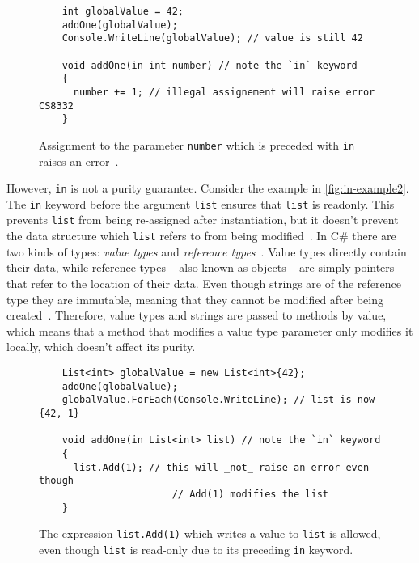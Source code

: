 \documentclass[a4paper,12pt]{article}
\begin{document}
\begin{figure}[H]
  \centering
  \begin{lstlisting}
    int globalValue = 42;
    addOne(globalValue);
    Console.WriteLine(globalValue); // value is still 42

    void addOne(in int number) // note the `in` keyword
    {
      number += 1; // illegal assignement will raise error CS8332
    }
  \end{lstlisting}
  \caption{Assignment to the parameter \texttt{number} which is preceded with \texttt{in} raises an error~\cite{microsoft-in-modifier}.}
  \label{fig:in-example1}
\end{figure}

However, \texttt{in} is not a purity guarantee. Consider the example in \autoref{fig:in-example2}. The \texttt{in} keyword before the argument \texttt{list} ensures that \texttt{list} is readonly. This prevents \texttt{list} from being re-assigned after instantiation, but it doesn't prevent the data structure which \texttt{list} refers to from being modified~\cite{buchanan-static-lists}. In C\# there are two kinds of types: \textit{value types} and \textit{reference types}~\cite{microsoft-types}. Value types directly contain their data, while reference types -- also known as objects -- are simply pointers that refer to the location of their data.  Even though strings are of the reference type they are immutable, meaning that they cannot be modified after being created~\cite{microsoft-strings}. Therefore, value types and strings are passed to methods by value, which means that a method that modifies a value type parameter only modifies it locally, which doesn't affect its purity.

\begin{figure}[H]
  \centering
  \begin{lstlisting}
    List<int> globalValue = new List<int>{42};
    addOne(globalValue);
    globalValue.ForEach(Console.WriteLine); // list is now {42, 1}

    void addOne(in List<int> list) // note the `in` keyword
    {
      list.Add(1); // this will _not_ raise an error even though
                       // Add(1) modifies the list
    }
  \end{lstlisting}
  \caption{The expression \texttt{list.Add(1)} which writes a value to \texttt{list} is allowed, even though \texttt{list} is read-only due to its preceding \texttt{in} keyword.}
  \label{fig:in-example2}
\end{figure}
\end{document}
